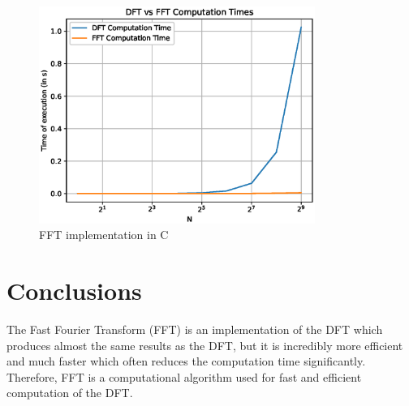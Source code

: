 \documentclass[journal,12pt,twocolumn]{IEEEtran}
\begin{document}
\begin{figure}[!ht]
    \centering
    \includegraphics[width=9cm]{./figs/comparetime.eps}
    \caption{FFT implementation in C}
    \label{fig:comparison}
\end{figure}
\section{Conclusions}
The Fast Fourier Transform (FFT) is an implementation of the DFT which produces almost the same results as the DFT, but it is incredibly more efficient and much faster which often reduces the computation time significantly. Therefore, FFT is a computational algorithm used for fast and efficient computation of the DFT.
\end{document}
